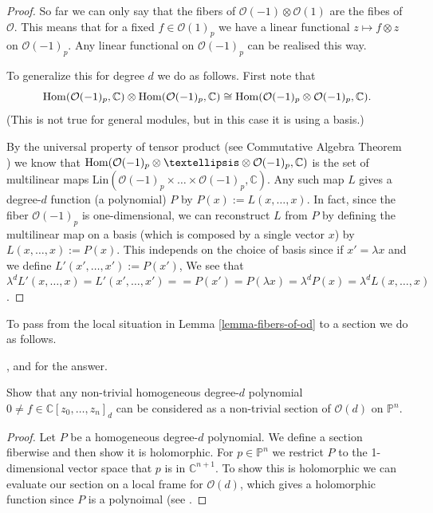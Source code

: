 \begin{proof}
So far we can only say that the fibers of
$\mathcal{O}(-1)\otimes \mathcal{O}(1)$ are
the fibes of $\mathcal{O}$.
This means that for a fixed $f \in
\mathcal{O}(1)_p$
we have a linear functional $z \mapsto
f\otimes z$
on $\mathcal{O}(-1)_p$. Any linear functional
on $\mathcal{O}(-1)_p$
can be realised this way.

To generalize this for degree $d$ we do as
follows.
First note that
$$
\mathop{\mathrm{Hom}}\nolimits(\mathcal{O}(-1)_p,\mathbb{C})
\otimes\mathop{\mathrm{Hom}}\nolimits(\mathcal{O}(-1)_p,\mathbb{C})
\cong
\mathop{\mathrm{Hom}}\nolimits(\mathcal{O}(-1)_p\otimes\mathcal{O}(-1)
_p,\mathbb{C}).
$$
(This is not true for general modules,
but in this case it is using a basis.)

By the universal property of tensor product
(see Commutative Algebra Theorem
\cite{theorem-unive-prope-tenso-produ})
we know that
$\Hom(\mathcal{O}(-1)_p \otimes … \otimes
\mathcal{O}(-1)_p,\mathbb{C})$
is the set of multilinear maps
$\text{Lin}(\mathcal{O}(-1)_p
\times…\times\mathcal{O}(-1)_p,\mathbb{C})$.
Any such map $L$ gives a degree-$d$ function
(a polynomial) $P$ by
$P(x):=L(x,…,x)$.
In fact, since the fiber $\mathcal{O}(-1)_p$
is one-dimensional,
we can reconstruct $L$ from $P$ by defining
the multilinear map on a basis (which is
composed by a single vector $x$)
by $L(x,…,x):=P(x)$. This independs on the
choice
of basis since if $x'=\lambda x$ and we
define $L'(x',…,x'):=P(x')$,
We see that $\lambda^d L'(x,…,x)=L'(x',…,x')=
=P(x')=P(\lambda x)=\lambda^d P(x)=\lambda^d
L(x,…,x)$.
\end{proof}

\noindent
To pass from the local situation in Lemma
\ref{lemma-fibers-of-od}
to a section we do as follows.

\begin{exercise}
\label{exercise-polynomials-are-sections}
\begin{reference}
\cite[Exercise 2.2.8]{huc}, and
\cite[Lemma 3.30]{lec} for the answer.
\end{reference}
Show that any non-trivial homogeneous
degree-$d$ polynomial $0 \neq f \in
\mathbb{C}[z_0,…,z_n]_d$ can be considered as
a non-trivial section of $\mathcal{O}(d)$ on
$\mathbb{P}^n$.
\end{exercise}

\begin{proof}
Let $P$ be a homogeneous degree-$d$
polynomial. We define a section fiberwise and
then show it is holomorphic. For $p \in
\mathbb{P}^n$ we restrict $P$ to the
1-dimensional vector space that $p$ is in
$\mathbb{C}^{n+1}$. To show this is
holomorphic we can evaluate our section on a
local frame for $\mathcal{O}(d)$, which gives
a holomorphic function since $P$ is a
polynoimal (see \cite[Proposition 3.35]{lec}.
\end{proof}

